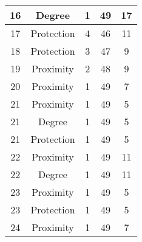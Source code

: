 \documentclass[results.tex]{subfiles}
\begin{document}
\begin{center}
\begin{tabular}{| c || c | c | c | c |}
            \hline
            16                      & Degree                       & 1                      & 49                      & 17                   \\
            \hline
            17                      & Protection                   & 4                      & 46                      & 11                   \\
            \hline
            18                      & Protection                   & 3                      & 47                      & 9                    \\
            \hline
            19                      & Proximity                    & 2                      & 48                      & 9                    \\
            \hline
            20                      & Proximity                    & 1                      & 49                      & 7                    \\
            \hline
            21                      & Proximity                    & 1                      & 49                      & 5                    \\
            \hline
            21                      & Degree                       & 1                      & 49                      & 5                    \\
            \hline
            21                      & Protection                   & 1                      & 49                      & 5                    \\
            \hline
            22                      & Proximity                    & 1                      & 49                      & 11                   \\
            \hline
            22                      & Degree                       & 1                      & 49                      & 11                   \\
            \hline
            23                      & Proximity                    & 1                      & 49                      & 5                    \\
            \hline
            23                      & Protection                   & 1                      & 49                      & 5                    \\
            \hline
            24                      & Proximity                    & 1                      & 49                      & 7                    \\

\end{tabular}
\end{center}
\end{document}
